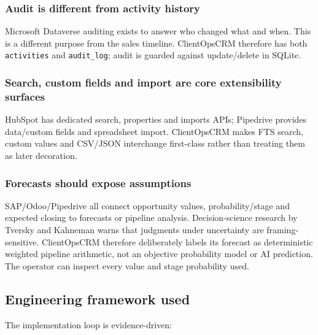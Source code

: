 \documentclass[
]{article}
\begin{document}
\subsubsection{Audit is different from activity
history}\label{audit-is-different-from-activity-history}

Microsoft Dataverse auditing exists to answer who changed what and when.
This is a different purpose from the sales timeline. ClientOpsCRM
therefore has both \texttt{activities} and \texttt{audit\_log}; audit is
guarded against update/delete in SQLite.

\subsubsection{Search, custom fields and import are core extensibility
surfaces}\label{search-custom-fields-and-import-are-core-extensibility-surfaces}

HubSpot has dedicated search, properties and imports APIs; Pipedrive
provides data/custom fields and spreadsheet import. ClientOpsCRM makes
FTS search, custom values and CSV/JSON interchange first-class rather
than treating them as later decoration.

\subsubsection{Forecasts should expose
assumptions}\label{forecasts-should-expose-assumptions}

SAP/Odoo/Pipedrive all connect opportunity values, probability/stage and
expected closing to forecasts or pipeline analysis. Decision-science
research by Tversky and Kahneman warns that judgments under uncertainty
are framing-sensitive. ClientOpsCRM therefore deliberately labels its
forecast as deterministic weighted pipeline arithmetic, not an objective
probability model or AI prediction. The operator can inspect every value
and stage probability used.

\subsection{Engineering framework
used}\label{engineering-framework-used}

The implementation loop is evidence-driven:
\end{document}

